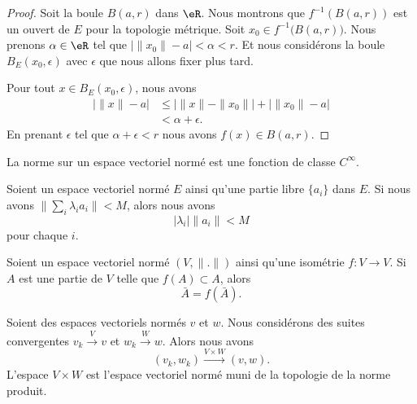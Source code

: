 \begin{proof}
	Soit la boule \( B(a,r)\) dans \( \eR\). Nous montrons que \( f^{-1}(B(a,r))\) est un ouvert de \( E\) pour la topologie métrique. Soit \( x_0\in f^{-1}\big( B(a,r) \big)\). Nous prenons \( \alpha\in \eR\) tel que \( \big| \| x_0 \|-a \big|<\alpha<r\). Et nous considérons la boule \( B_E(x_0,\epsilon)\) avec \( \epsilon\) que nous allons fixer plus tard.

	Pour tout \( x\in B_E(x_0,\epsilon)\), nous avons
	\begin{subequations}
		\begin{align}
			\big| \| x \|-a \big| & \leq\big| \| x \|-\| x_0 \| \big|+\big| \| x_0 \|-a \big| \\
			                      & <\alpha+\epsilon.
		\end{align}
	\end{subequations}
	En prenant \( \epsilon\) tel que \( \alpha+\epsilon<r\) nous avons \( f(x)\in B(a,r)\).
\end{proof}

\begin{proposition}     \label{PROPooQUAZooGXskwF}
	La norme sur un espace vectoriel normé est une fonction de classe \(  C^{\infty}\).
\end{proposition}

\begin{lemma}        \label{LEMooGCJEooOAynZW}
	Soient un espace vectoriel normé \( E\) ainsi qu'une partie libre \( \{ a_i \}\) dans \( E\). Si nous avons \( \| \sum_i\lambda_ia_i \|<M\), alors nous avons
	\begin{equation}
		| \lambda_i |\| a_i \|<M
	\end{equation}
	pour chaque \( i\).
\end{lemma}

\begin{lemma}       \label{LEMooSCIIooRyRrHA}
	Soient un espace vectoriel normé \( (V,\| . \|)\) ainsi qu'une isométrie \( f\colon V\to V\). Si \( A\) est une partie de \( V\) telle que \( f(A)\subset A\), alors
	\begin{equation}
		\bar A=f(\bar A).
	\end{equation}
\end{lemma}


\begin{proposition}	\label{PROPooMHAVooRgJjMB}
	Soient des espaces vectoriels normés \( v\) et \( w\). Nous considérons des suites convergentes \( v_k\stackrel{ V}{\longrightarrow} v\) et \( w_k\stackrel{ W}{\longrightarrow} w\). Alors nous avons
	\begin{equation}
		(v_k,w_k)\stackrel{ V\times W}{\longrightarrow} (v,w).
	\end{equation}
	L'espace \( V\times W\) est l'espace vectoriel normé muni de la topologie de la norme produit.
\end{proposition}


